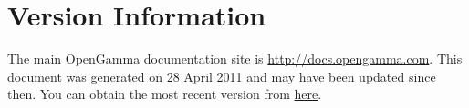 
\section{Version Information}

\noindent The main OpenGamma documentation site is \url{http://docs.opengamma.com}. This document was generated on 28 April 2011 and may have been updated since then. You can obtain the most recent version from \href{http://docs-static.opengamma.com/Latest\%20Version/analytics/<< s.canonical_filename().replace(".tex", ".pdf") >>}{here}.


